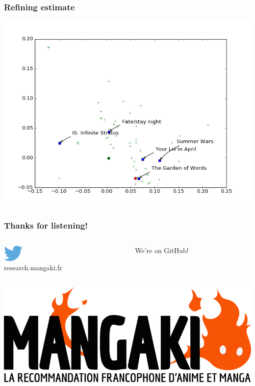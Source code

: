 \documentclass[handout]{beamer}
\begin{document}
\begin{frame}
  \frametitle{Refining estimate}
  \includegraphics[width=\linewidth]{figures/4.png}
\end{frame}


\begin{frame}
	\frametitle{Thanks for listening!}
  \LARGE
	\begin{columns}
	\begin{column}{0.5\textwidth}
  \includegraphics[width=1cm]{figures/twitter.png}\,\,\\[1mm]
  research.mangaki.fr
	\end{column}
	\begin{column}{0.5\textwidth}
	\centering
  \huge We're on GitHub!
  \end{column}
  \end{columns}
  \vspace{5mm}
  \includegraphics[width=\linewidth]{figures/mangaki.png}
\end{frame}


\end{document}
